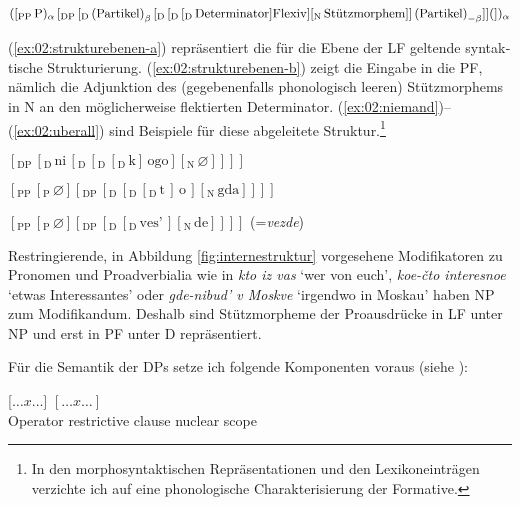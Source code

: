 \documentclass[output=paper, colorlinks, citecolor=brown, booklanguage=german]{langscibook}
\begin{document}
\begin{otherlanguage}{german}
    \ex\label{ex:02:strukturebenen-b} $([_\textrm{PP}\, \textrm{P})_{\alpha}\, [_\textrm{DP}\, [_\textrm{D}\, \textrm{(Partikel)}_{\beta}\, [_\textrm{D}\, [_\textrm{D}\, [_\textrm{D}\, \textrm{Determinator} ] \newline \textrm{Flexiv} ] [_\textrm{N}\, \textrm{Stützmorphem} ]]\, \textrm{(Partikel)}_{-\beta} ]](])_{\alpha}$
\z\z 

\noindent (\ref{ex:02:strukturebenen-a}) repräsentiert die für die Ebene der LF geltende syntaktische Strukturierung. (\ref{ex:02:strukturebenen-b}) zeigt die Eingabe in die PF, nämlich die Adjunktion des (gegebenenfalls phonologisch leeren) Stützmorphems in N an den möglicherweise flektierten Determinator. (\ref{ex:02:niemand})--(\ref{ex:02:uberall}) sind Beispiele für diese abgeleitete Struktur.\footnote{In den morphosyntaktischen Repräsentationen und den Lexikoneinträgen verzichte ich auf eine phonologische Charakterisierung der Formative.}

\ea\label{ex:02:niemand} $[_\textrm{DP}\, [_\textrm{D}\, \textrm{ni}\, [_\textrm{D}\, [_\textrm{D}\, [_\textrm{D}\, \textrm{k} ]\, \textrm{ogo} ] [_\textrm{N}\, \varnothing ]]]]$
\z 

\ea\label{ex:02:damals} $[_\textrm{PP}\, [_\textrm{P}\, \varnothing ] [_\textrm{DP}\, [_\textrm{D}\, [_\textrm{D}\, [_\textrm{D}\, \textrm{t}\, ]\, \textrm{o}\, ] [_\textrm{N}\, \textrm{gda} ]]]]$
\z 

\ea\label{ex:02:uberall} $[_\textrm{PP}\, [_\textrm{P}\, \varnothing ] [_\textrm{DP}\, [_\textrm{D}\, [_\textrm{D}\, \textrm{ves'}\, ] [_\textrm{N}\, \textrm{de} ]]]]$ (=\textit{vezde})
\z 

\noindent Restringierende, in Abbildung \ref{fig:internestruktur} vorgesehene Modifikatoren zu Pronomen und Proadverbialia wie in \textit{kto iz vas} `wer von euch', \textit{koe-čto interesnoe} `etwas Interessantes' oder \textit{gde-nibud' v Moskve} `irgendwo in Moskau' haben NP zum Modifikandum. Deshalb sind Stützmorpheme der Proausdrücke in LF unter NP und erst in PF unter D repräsentiert.

Für die Semantik der DPs setze ich folgende Komponenten voraus (siehe \citealt{Zimmermann1999}):

\ea\label{ex:02:komponenten}
     {[$ \dots x \dots ]$} {$[ \dots x \dots ]$}\\
    Operator {restrictive clause} {nuclear scope}\\
\z 


\end{otherlanguage}
\end{document}
